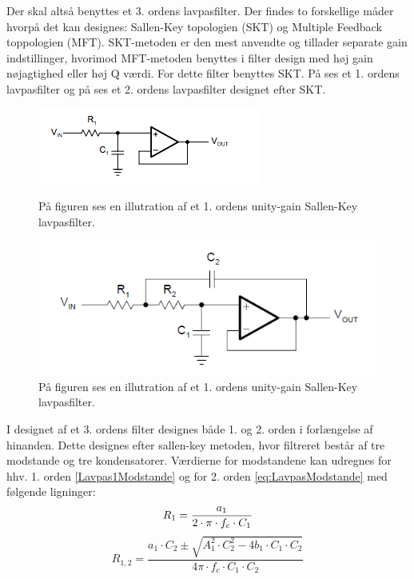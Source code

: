 Der skal altså benyttes et 3. ordens lavpasfilter. Der findes to forskellige måder hvorpå det kan designes: Sallen-Key topologien (SKT) og Multiple Feedback toppologien (MFT). SKT-metoden er den mest anvendte og tillader separate gain indstillinger, hvorimod MFT-metoden benyttes i filter design med høj gain nøjagtighed eller høj Q værdi. For dette filter benyttes SKT. På  ses et 1. ordens lavpasfilter og på  ses et 2. ordens lavpasfilter designet efter SKT. \cite{Carter2013}
	
\begin{figure}[H]
	\centering
	\begin{minipage}[b]{0.45\textwidth}
		\includegraphics[width=\textwidth]{figures/cProblemloesning/Lavpasfilter1_teoretisk.PNG}
		\caption{På figuren ses en illutration af et 1. ordens unity-gain Sallen-Key lavpasfilter.}
		\label{fig:SallenKey1}
	\end{minipage}
	\hfill
	\begin{minipage}[b]{0.45\textwidth}
		\includegraphics[width=\textwidth]{figures/cProblemloesning/Sallenlavpas.PNG}
		\caption{På figuren ses en illutration af et 1. ordens unity-gain Sallen-Key lavpasfilter.}
		\label{fig:SallenKey2}
	\end{minipage}
\end{figure}

I designet af et 3. ordens filter designes både 1. og 2. orden i forlængelse af hinanden. Dette designes efter sallen-key metoden, hvor filtreret består af tre modstande og tre kondensatorer. Værdierne for modstandene kan udregnes for hhv. 1. orden \ref{Lavpas1Modstande} og for 2. orden \eqref{eq:LavpasModstande} med følgende ligninger:
\begin{equation} \label{Lavpas1Modstande}
R_{1} = \frac{a_1}{2 \cdot \pi \cdot f_c \cdot C_1} \\
\end{equation}
\begin{equation}
 \label{eq:LavpasModstande}
R_{1,2} = \frac{a_1 \cdot C_2 \pm \sqrt{A_1^2 \cdot C_2^2 - 4b_1 \cdot C_1 \cdot C_2}}{4 \pi \cdot f_c \cdot C_1 \cdot C_2}
\end{equation}

